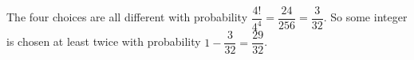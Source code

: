 The four choices are all different with probability $\dfrac{4!}{4^4}=\dfrac{24}{256}=\dfrac3{32}$. So some integer is chosen at least twice with probability $1-\dfrac3{32}=\boxed{\dfrac{29}{32}}$.
